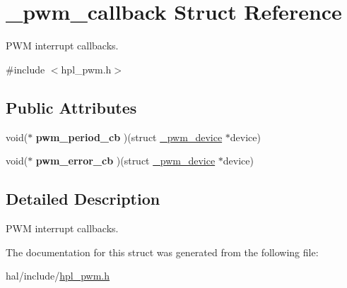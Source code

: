 \hypertarget{struct__pwm__callback}{}\section{\+\_\+pwm\+\_\+callback Struct Reference}
\label{struct__pwm__callback}


P\+WM interrupt callbacks.  




{\ttfamily \#include $<$hpl\+\_\+pwm.\+h$>$}

\subsection*{Public Attributes}
\begin{DoxyCompactItemize}
\item 
\mbox{\label{struct__pwm__callback_a3fe178a291b3f564abbd43c93947bea9}} 
void($\ast$ {\bfseries pwm\+\_\+period\+\_\+cb} )(struct \hyperlink{struct__pwm__device}{\+\_\+pwm\+\_\+device} $\ast$device)
\item 
\mbox{\label{struct__pwm__callback_a04d1a293eed9eeb74eb33780409a036a}} 
void($\ast$ {\bfseries pwm\+\_\+error\+\_\+cb} )(struct \hyperlink{struct__pwm__device}{\+\_\+pwm\+\_\+device} $\ast$device)
\end{DoxyCompactItemize}


\subsection{Detailed Description}
P\+WM interrupt callbacks. 

The documentation for this struct was generated from the following file\+:\begin{DoxyCompactItemize}
\item 
hal/include/\hyperlink{hpl__pwm_8h}{hpl\+\_\+pwm.\+h}\end{DoxyCompactItemize}
